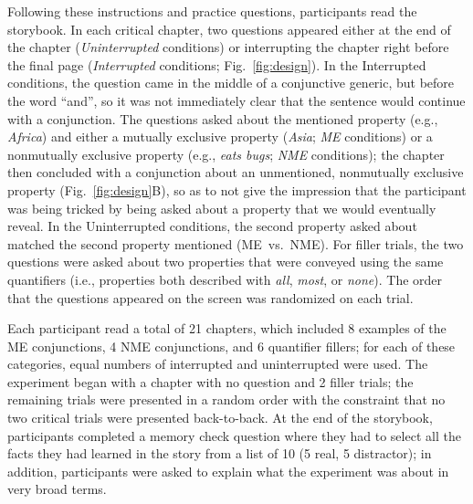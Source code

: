 \documentclass[10pt,letterpaper]{article}
\newcommand{\red}[1]{{\textcolor{Red}{#1}}}
\begin{document}
Following these instructions and practice questions, participants read the storybook.
In each critical chapter, two questions appeared either at the end of the chapter (\emph{Uninterrupted} conditions) or interrupting the chapter right before the final page  (\emph{Interrupted} conditions; Fig.~\ref{fig:design}).
In the Interrupted conditions, the question came in the middle of a conjunctive generic, but before the word ``and'', so it was not immediately clear that the sentence would continue with a conjunction.
The questions asked about the mentioned property (e.g., \emph{Africa}) and either a mutually exclusive property (\emph{Asia}; \emph{ME} conditions) or a nonmutually exclusive property (e.g., \emph{eats bugs}; \emph{NME} conditions); the chapter then concluded with a conjunction about an unmentioned, nonmutually exclusive property (Fig.~\ref{fig:design}B), so as to not give the impression that the participant was being tricked by being asked about a property that we would eventually reveal.
In the Uninterrupted conditions,  the second property asked about matched the second property mentioned (ME~vs.~NME). 
For filler trials, the two questions were asked about two properties that were conveyed using the same quantifiers (i.e., properties both described with \emph{all}, \emph{most}, or \emph{none}).
The order that the questions appeared on the screen was randomized on each trial.

Each participant read a total of 21 chapters, which included 8 examples of the ME conjunctions, 4 NME conjunctions, and 6 quantifier fillers; for each of these categories, equal numbers of interrupted and uninterrupted were used. 
The experiment began with a chapter with no question and 2 filler trials; the remaining trials were presented in a random order with the constraint that no two critical trials were presented back-to-back. 
At the end of the storybook, participants completed a memory check question where they had to select all the facts they had learned in the story from a list of 10 (5 real, 5 distractor); in addition, participants were asked to explain what the experiment was about in very broad terms.

\end{document}
